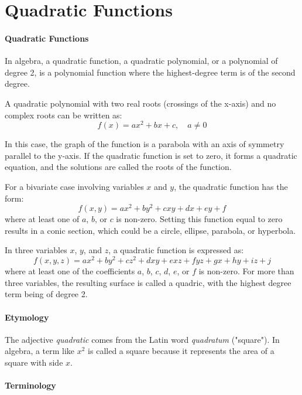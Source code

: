\section{Quadratic Functions}
\label{sec:quadratic-functions}

\paragraph{Quadratic Functions}

In algebra, a quadratic function, a quadratic polynomial, or a polynomial of degree 2, is a polynomial function where the highest-degree term is of the second degree.

A quadratic polynomial with two real roots (crossings of the x-axis) and no complex roots can be written as:
$$
f(x) = ax^2 + bx + c, \quad a \neq 0
$$

In this case, the graph of the function is a parabola with an axis of symmetry parallel to the y-axis. If the quadratic function is set to zero, it forms a quadratic equation, and the solutions are called the roots of the function.

For a bivariate case involving variables $x$ and $y$, the quadratic function has the form:
$$
f(x, y) = ax^2 + by^2 + cxy + dx + ey + f
$$
where at least one of $a$, $b$, or $c$ is non-zero. Setting this function equal to zero results in a conic section, which could be a circle, ellipse, parabola, or hyperbola.

In three variables $x$, $y$, and $z$, a quadratic function is expressed as:
$$
f(x, y, z) = ax^2 + by^2 + cz^2 + dxy + exz + fyz + gx + hy + iz + j
$$
where at least one of the coefficients $a$, $b$, $c$, $d$, $e$, or $f$ is non-zero. For more than three variables, the resulting surface is called a quadric, with the highest degree term being of degree 2.

\paragraph{Etymology}

The adjective \textit{quadratic} comes from the Latin word \textit{quadratum} ("square"). In algebra, a term like $x^2$ is called a square because it represents the area of a square with side $x$.

\paragraph{Terminology}

